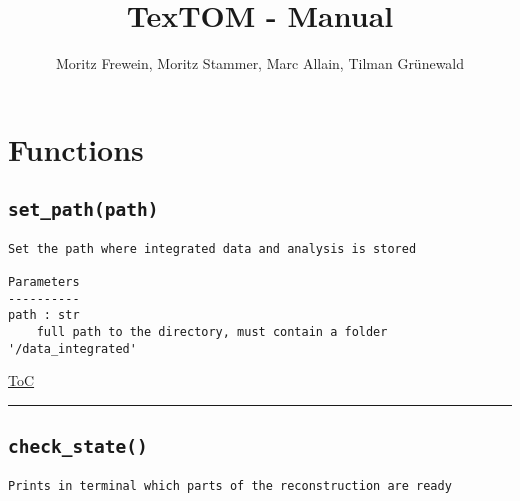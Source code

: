 \documentclass{article}
\title{TexTOM - Manual}
\author{Moritz Frewein, Moritz Stammer, Marc Allain, Tilman Grünewald}
\begin{document}
\maketitle
\label{toc}
\tableofcontents

                
\subsectionfont{\large\ttfamily\raggedright}


\section{Functions}\label{sec:functions}
\subsection*{\texttt{set\_path(path)}}
\label{fun:setpath}

\begin{lstlisting}[language=docstring]
Set the path where integrated data and analysis is stored

Parameters
----------
path : str
    full path to the directory, must contain a folder '/data_integrated'
\end{lstlisting}

\begin{flushright}

\hyperref[toc]{ToC}

\end{flushright}



\vspace{5mm}

\hrule

\subsection*{\texttt{check\_state()}}
\label{fun:checkstate}

\begin{lstlisting}[language=docstring]
Prints in terminal which parts of the reconstruction are ready
    
\end{lstlisting}
\end{document}
